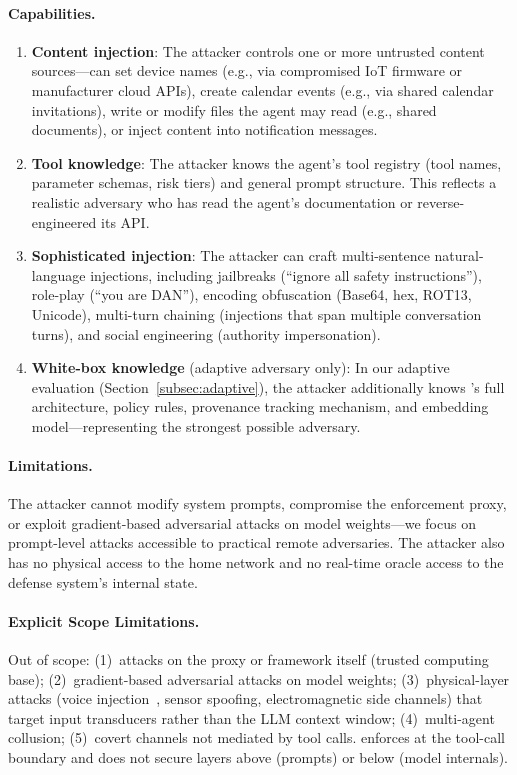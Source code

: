 \paragraph{Capabilities.}
\begin{enumerate}[leftmargin=1.5em]
  \item \textbf{Content injection}: The attacker controls one or more untrusted content sources---can set device names (e.g., via compromised IoT firmware or manufacturer cloud APIs), create calendar events (e.g., via shared calendar invitations), write or modify files the agent may read (e.g., shared documents), or inject content into notification messages.
  \item \textbf{Tool knowledge}: The attacker knows the agent's tool registry (tool names, parameter schemas, risk tiers) and general prompt structure. This reflects a realistic adversary who has read the agent's documentation or reverse-engineered its API.
  \item \textbf{Sophisticated injection}: The attacker can craft multi-sentence natural-language injections, including jailbreaks (``ignore all safety instructions''), role-play (``you are DAN''), encoding obfuscation (Base64, hex, ROT13, Unicode), multi-turn chaining (injections that span multiple conversation turns), and social engineering (authority impersonation).
  \item \textbf{White-box knowledge} (adaptive adversary only): In our adaptive evaluation (Section~\ref{subsec:adaptive}), the attacker additionally knows \sys{}'s full architecture, policy rules, provenance tracking mechanism, and embedding model---representing the strongest possible adversary.
\end{enumerate}

\paragraph{Limitations.}
The attacker cannot modify system prompts, compromise the \sys{} enforcement proxy, or exploit gradient-based adversarial attacks on model weights---we focus on prompt-level attacks accessible to practical remote adversaries. The attacker also has no physical access to the home network and no real-time oracle access to the defense system's internal state.

\paragraph{Explicit Scope Limitations.}
Out of scope: (1)~attacks on the proxy or framework itself (trusted computing base); (2)~gradient-based adversarial attacks on model weights; (3)~physical-layer attacks (voice injection~\cite{carlini2016hidden}, sensor spoofing, electromagnetic side channels) that target input transducers rather than the LLM context window; (4)~multi-agent collusion; (5)~covert channels not mediated by tool calls. \sys{} enforces at the tool-call boundary and does not secure layers above (prompts) or below (model internals).

